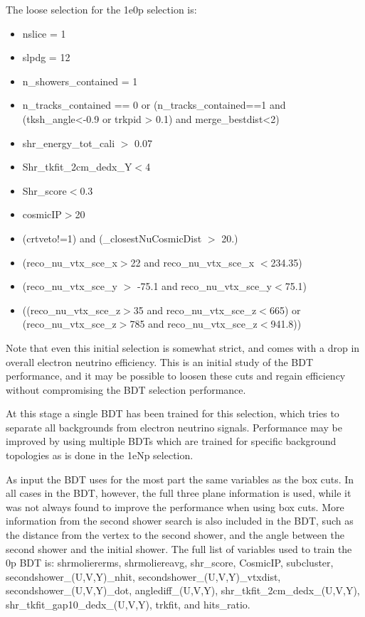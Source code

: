 \documentclass[a4paper]{article}
\begin{document}
The loose selection for the 1e0p selection is:
\begin{itemize}
    \item nslice = 1
    \item slpdg = 12
    \item n\_showers\_contained = 1
    \item n\_tracks\_contained == 0 or (n\_tracks\_contained==1 and (tksh\_angle<-0.9 or trkpid > 0.1) and merge\_bestdist<2)
    \item shr\_energy\_tot\_cali $>$ 0.07
    \item Shr\_tkfit\_2cm\_dedx\_Y$<$4
    \item Shr\_score$<$0.3
    \item cosmicIP$>$20
    \item (crtveto!=1) and (\_closestNuCosmicDist $>$ 20.)
    \item (reco\_nu\_vtx\_sce\_x$>$22 and reco\_nu\_vtx\_sce\_x $<$234.35)
    \item (reco\_nu\_vtx\_sce\_y $>$ -75.1 and reco\_nu\_vtx\_sce\_y$<$75.1)
    \item ((reco\_nu\_vtx\_sce\_z$>$35 and reco\_nu\_vtx\_sce\_z$<$665) or (reco\_nu\_vtx\_sce\_z$>$785 and reco\_nu\_vtx\_sce\_z$<$941.8))
\end{itemize}

Note that even this initial selection is somewhat strict, and comes with a drop in overall electron neutrino efficiency.  This is an initial study of the BDT performance, and it may be possible to loosen these cuts and regain efficiency without compromising the BDT selection performance. 

At this stage a single BDT has been trained for this selection, which tries to separate all backgrounds from electron neutrino signals.  Performance may be improved by using multiple BDTs which are trained for specific background topologies as is done in the 1eNp selection. 

As input the BDT uses for the most part the same variables as the box cuts.  In all cases in the BDT, however, the full three plane information is used, while it was not always found to improve the performance when using box cuts.  More information from the second shower search is also included in the BDT, such as the distance from the vertex to the second shower, and the angle between the second shower and the initial shower. The full list of variables used to train the 0p BDT is: shrmoliererms, shrmoliereavg, shr\_score, CosmicIP, subcluster, secondshower\_(U,V,Y)\_nhit, secondshower\_(U,V,Y)\_vtxdist, secondshower\_(U,V,Y)\_dot, anglediff\_(U,V,Y), shr\_tkfit\_2cm\_dedx\_(U,V,Y), shr\_tkfit\_gap10\_dedx\_(U,V,Y), trkfit, and hits\_ratio.
\end{document}

